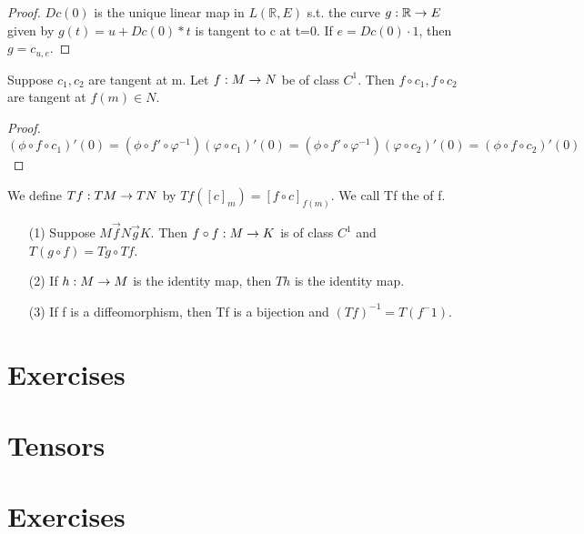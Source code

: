 \begin{proof}
$Dc(0)$ is the unique linear map in $L(\mathbb{R},E)$ s.t. the curve ${g}:{\mathbb{R}}\rightarrow{E}$ given by $g(t)=u+Dc(0)*t$ is tangent to c
at t=0. If $e=Dc(0)\cdot 1$, then $g= c_{u,e}$.
\end{proof}
\begin{prop}
Suppose $c_1,c_2$ are tangent at m. Let ${f}:{M}\rightarrow{N}$ be of class $C^1$. Then $f\circ c_1, f\circ c_2$ are tangent at $f(m)\in N$.
\end{prop}
\begin{proof}
$(\phi\circ f\circ c_1)'(0)=(\phi\circ f'\circ\varphi^{-1})(\varphi\circ c_1)'(0)=(\phi\circ f'\circ\varphi^{-1})(\varphi\circ c_2)'(0)
=(\phi\circ f\circ c_2)'(0)$
\end{proof}
\begin{definition}
We define ${Tf}:{TM}\rightarrow{TN}$ by $Tf([c]_m)=[f\circ c]_{f(m)}$. We call Tf the  of f.
\end{definition}
\begin{thm}
\begin{enumerate}
\item[(1)] Suppose $M\overset{\rightarrow}{f}N\overset{\rightarrow}{g}K$. Then ${f\circ f}:{M}\rightarrow{K}$ is of class $C^1$ and $T(g\circ f)
=Tg\circ Tf$.
\item[(2)] If ${h}:{M}\rightarrow{M}$ is the identity map, then $Th$ is the identity map.
\item[(3)] If f is a diffeomorphism, then Tf is a bijection and $(Tf)^{-1}= T(f^-1)$.
\end{enumerate}

\end{thm}
\section*{Exercises}
\section{Tensors}
\section*{Exercises}
